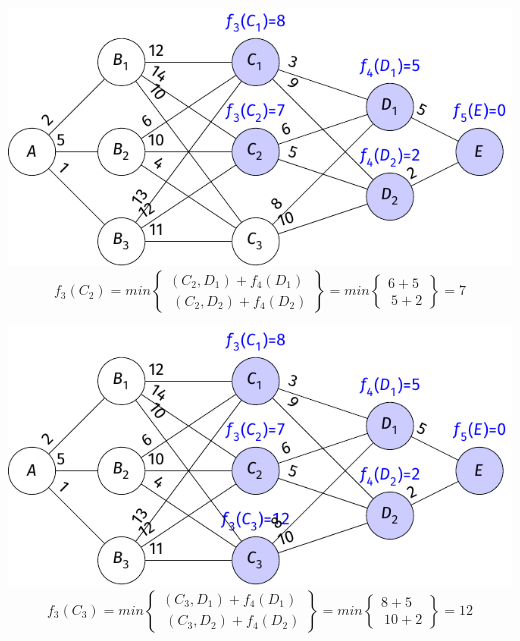\begin{frame}
    \includegraphics{fig/4-2-5.pdf}
    $$f_3(C_2)=min \begin{Bmatrix}(C_2,D_1)+f_4(D_1)\\\ (C_2,D_2)+f_4(D_2) \end{Bmatrix} =min \begin{Bmatrix}6+5\\\ 5+2 \end{Bmatrix} =7$$
\end{frame}
\begin{frame}
    \includegraphics{fig/4-2-6.pdf}
    $$f_3(C_3)=min \begin{Bmatrix}(C_3,D_1)+f_4(D_1)\\\ (C_3,D_2)+f_4(D_2) \end{Bmatrix} =min \begin{Bmatrix}8+5\\\ 10+2 \end{Bmatrix} =12$$
\end{frame}
